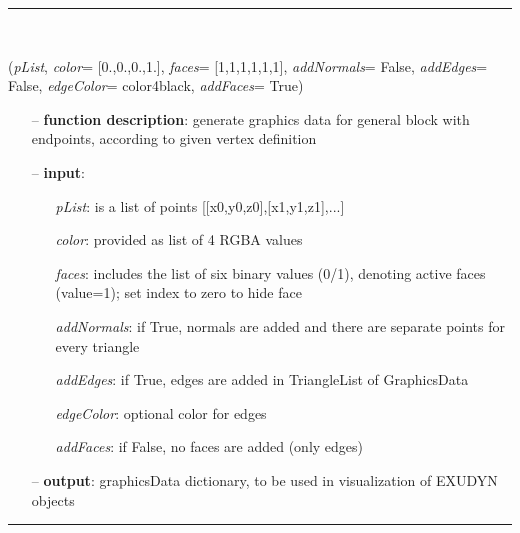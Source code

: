 \begin{itemize}[leftmargin=1.4cm]
\begin{itemize}[leftmargin=1.4cm]
\begin{itemize}[leftmargin=1.4cm]
\begin{itemize}[leftmargin=0.5cm]
\begin{itemize}[leftmargin=1.4cm]
\begin{itemize}[leftmargin=1.4cm]
\begin{itemize}[leftmargin=0.5cm]
\begin{itemize}[leftmargin=1.4cm]
\begin{itemize}[leftmargin=0.5cm]
%
\noindent\rule{8cm}{0.75pt}\vspace{1pt} \\ 
\begin{flushleft}
\label{sec:graphicsDataUtilities:GraphicsDataCube}
({\it pList}, {\it color}= [0.,0.,0.,1.], {\it faces}= [1,1,1,1,1,1], {\it addNormals}= False, {\it addEdges}= False, {\it edgeColor}= color4black, {\it addFaces}= True)
\end{flushleft}
\setlength{\itemindent}{0.7cm}
\begin{itemize}[leftmargin=0.7cm]
\item[--]
{\bf function description}: generate graphics data for general block with endpoints, according to given vertex definition
\item[--]
{\bf input}: \vspace{-6pt}
\begin{itemize}[leftmargin=1.2cm]
\setlength{\itemindent}{-0.7cm}
\item[]{\it pList}: is a list of points [[x0,y0,z0],[x1,y1,z1],...]
\item[]{\it color}: provided as list of 4 RGBA values
\item[]{\it faces}: includes the list of six binary values (0/1), denoting active faces (value=1); set index to zero to hide face
\item[]{\it addNormals}: if True, normals are added and there are separate points for every triangle
\item[]{\it addEdges}: if True, edges are added in TriangleList of GraphicsData
\item[]{\it edgeColor}: optional color for edges
\item[]{\it addFaces}: if False, no faces are added (only edges)
\end{itemize}
\item[--]
{\bf output}: graphicsData dictionary, to be used in visualization of EXUDYN objects
\vspace{12pt}\end{itemize}
%
\noindent\rule{8cm}{0.75pt}\vspace{1pt} \\ 
\begin{flushleft}
\label{sec:graphicsDataUtilities:GraphicsDataSphere}

\end{flushleft}
\end{itemize}
\end{itemize}
\end{itemize}
\end{itemize}
\end{itemize}
\end{itemize}
\end{itemize}
\end{itemize}
\end{itemize}
